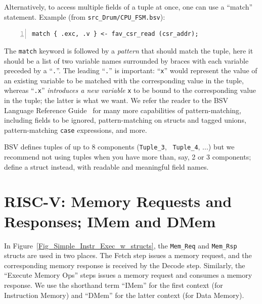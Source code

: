Alternatively, to access multiple fields of a tuple at once, one can
use a ``match'' statement. Example (from \verb|src_Drum/CPU_FSM.bsv|):


{\small
\begin{Verbatim}[frame=single, numbers=left]
   match { .exc, .v } <- fav_csr_read (csr_addr);
\end{Verbatim}
}

The \verb|match| keyword is followed by a \emph{pattern} that should
match the tuple, {\ie} here it should be a list of two variable names
surrounded by braces with each variable preceded by a ``\verb|.|''.
The leading ``\verb|.|'' is important: ``\verb|x|'' would represent
the value of an existing variable to be matched with the corresponding
value in the tuple, whereas ``\verb|.x|'' \emph{introduces a new
variable} \verb|x| to be bound to the corresponding value in the
tuple; the latter is what we want.  We refer the reader to the BSV
Language Reference Guide~\cite{BSV_Lang_Ref_Guide} for many more
capabilities of pattern-matching, including fields to be ignored,
pattern-matching on structs and tagged unions, pattern-matching
\verb|case| expressions, and more.

BSV defines tuples of up to 8 components ({\tt Tuple\_3}, {\tt
Tuple\_4}, ...) but we recommend not using tuples when you have more
than, say, 2 or 3 components; define a struct instead, with readable
and meaningful field names.


\section{RISC-V: Memory Requests and Responses; IMem and DMem}


In Figure~\ref{Fig_Simple_Instr_Exec_w_structs}, the \verb|Mem_Req|
and \verb|Mem_Rsp| structs are used in two places.  The Fetch step
issues a memory request, and the corresponding memory response is
received by the Decode step.  Similarly, the ``Execute Memory Ops''
steps issues a memory request and consumes a memory response.  We use
the shorthand term ``IMem'' for the first context (for Instruction
Memory) and ``DMem'' for the latter context (for Data Memory).

